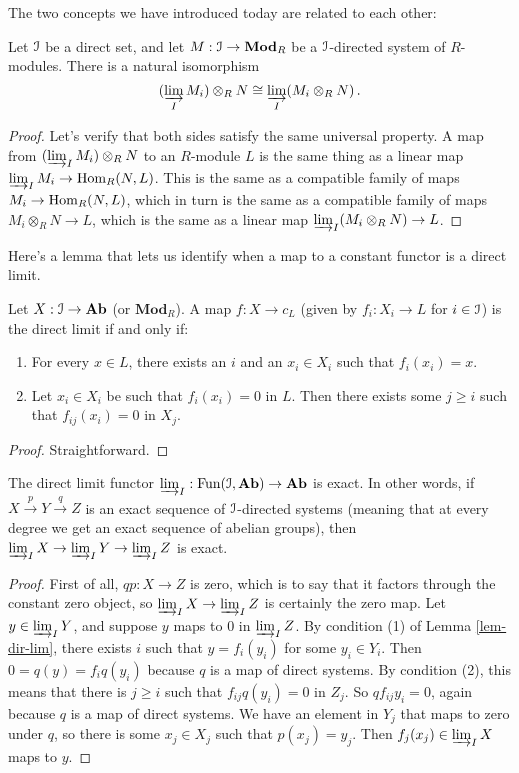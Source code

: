 The two concepts we have introduced today are related to each other:

\begin{prop}
Let $\mathcal I$ be a direct set, and let $M:\mathcal I\to\mathbf{Mod}_R$ be a $\mathcal I$-directed system of $R$-modules. There is a natural isomorphism 
\[
(\varinjlim_I M_i)\otimes_R N\cong \varinjlim_I (M_i\otimes_R N)\,.
\]
\end{prop}
\begin{proof}
Let's verify that both sides satisfy the same universal property. 
A map from $(\varinjlim_I M_i)\otimes_R N$ to an $R$-module $L$ is the same
thing as a linear map $\varinjlim_IM_i\to\operatorname{Hom}_R(N,L)$. This is the same as
a compatible family of maps $M_i\to\operatorname{Hom}_R(N,L)$, which in turn is the same
as a compatible family of maps $M_i\otimes_RN\to L$, which is the same as
a linear map $\varinjlim_I(M_i\otimes_RN)\to L$. 
\end{proof}

Here's a lemma that lets us identify when a map to a constant functor is a
direct limit.
\begin{lemma}
\label{lem-dir-lim}
Let $X:\mathcal I\to\mathbf{Ab}$ (or $\mathbf{Mod}_R$). A map $f:X\to c_L$ (given
by $f_i:X_i\to L$ for $i\in\mathcal I$) is the direct limit if and only if:
\begin{enumerate}
\item For every $x\in L$, there exists an $i$ and an $x_i\in X_i$ such that $f_i(x_i)=x$.
\item Let $x_i\in X_i$ be such that $f_i(x_i)=0$ in $L$. Then there exists some $j\geq i$ such that $f_{ij}(x_i)=0$ in $X_j$.
\end{enumerate}
\end{lemma}
\begin{proof}
Straightforward.
\end{proof}
\begin{prop}
The direct limit functor $\varinjlim_I:\operatorname{Fun}(\mathcal I,\mathbf{Ab})\to\mathbf{Ab}$ is exact. In other words, if $X\xrightarrow{p}Y\xrightarrow{q}Z$ is an exact sequence of $\mathcal I$-directed systems (meaning that at every degree we get an exact sequence of abelian groups), then $\varinjlim_IX\rightarrow \varinjlim_IY\rightarrow\varinjlim_IZ$ is exact.
\end{prop}
\begin{proof}
First of all, $qp:X\to Z$ is zero, which is to say that it factors through the constant zero object, so $\varinjlim_IX\to \varinjlim_I Z$ is certainly the zero map. Let $y\in \varinjlim_IY$, and suppose $y$ maps to $0$ in $\varinjlim_IZ$. By condition (1) of Lemma \ref{lem-dir-lim}, there exists $i$ such that $y=f_i(y_i)$ for some $y_i\in Y_i$. Then $0=q(y)=f_iq(y_i)$ because $q$ is a map of direct systems. By condition (2), this means that there is $j\geq i$ such that $f_{ij}q(y_i)=0$ in $Z_j$. So $qf_{ij}y_i=0$,
again because $q$ is a map of direct systems. We have an element in $Y_j$ that maps to zero under $q$, so there is some $x_j\in X_j$ such that $p(x_j)=y_j$.
Then $f_j(x_j)\in \varinjlim_IX$ maps to $y$.
\end{proof}

